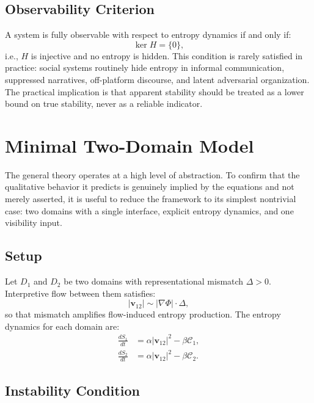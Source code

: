 \documentclass[12pt,a4paper]{article}
\begin{document}
\subsection{Observability Criterion}

A system is fully observable with respect to entropy dynamics if and only if:
\[
\ker H = \{0\},
\]
i.e., $H$ is injective and no entropy is hidden. This condition is rarely satisfied in practice: social systems routinely hide entropy in informal communication, suppressed narratives, off-platform discourse, and latent adversarial organization. The practical implication is that apparent stability should be treated as a lower bound on true stability, never as a reliable indicator.

\section{Minimal Two-Domain Model}

The general theory operates at a high level of abstraction. To confirm that the qualitative behavior it predicts is genuinely implied by the equations and not merely asserted, it is useful to reduce the framework to its simplest nontrivial case: two domains with a single interface, explicit entropy dynamics, and one visibility input.

\subsection{Setup}

Let $D_1$ and $D_2$ be two domains with representational mismatch $\Delta > 0$. Interpretive flow between them satisfies:
\[
|\mathbf{v}_{12}| \sim |\nabla \Phi| \cdot \Delta,
\]
so that mismatch amplifies flow-induced entropy production. The entropy dynamics for each domain are:
\begin{align*}
\frac{dS_1}{dt} &= \alpha |\mathbf{v}_{12}|^2 - \beta \mathcal{C}_1, \\
\frac{dS_2}{dt} &= \alpha |\mathbf{v}_{12}|^2 - \beta \mathcal{C}_2.
\end{align*}

\subsection{Instability Condition}
\end{document}
